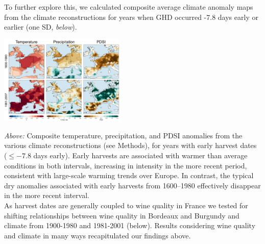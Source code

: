 \documentclass[portrait,a0,final] {a0poster} %
\begin{document}
\begin{multicols}{2}
\columnbreak
To further explore this, we calculated composite average climate anomaly maps from the climate reconstructions for years when GHD occurred -7.8 days early or earlier (one SD, \emph{below}). 
\vspace{2ex}
\begin{center}
\includegraphics[width=0.45\textwidth]{../MANUSCRIPT/fig_04_comp_map_JJA_comp.png}
\end{center}
\vspace{1ex}
\emph{Above:} Composite temperature, precipitation, and PDSI anomalies from the various climate reconstructions (see Methods), for years with early harvest dates ($\le-7.8$ days early). Early harvests are associated with warmer than average conditions in both intervals, increasing in intensity in the more recent period, consistent with large-scale warming trends over Europe. In contrast, the typical dry anomalies associated with early harvests from 1600--1980 effectively disappear in the more recent interval.\\

\indent As harvest dates are generally coupled to wine quality in France we tested for shifting relationships between wine quality in Bordeaux and Burgundy and climate from 1900-1980 and 1981-2001 (below). Results considering wine quality and climate in many ways recapitulated our findings above.\\



\end{multicols}
\end{document}
